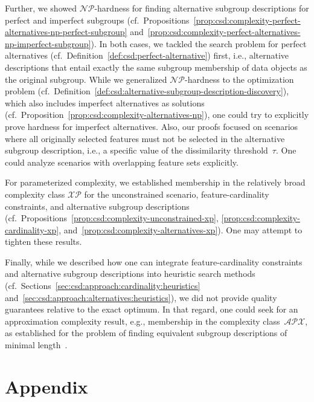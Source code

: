 \documentclass{article}
\theoremstyle{definition}
\begin{document}
Further, we showed $\mathcal{NP}$-hardness for finding alternative subgroup descriptions for perfect and imperfect subgroups (cf.~Propositions~\ref{prop:csd:complexity-perfect-alternatives-np-perfect-subgroup} and~\ref{prop:csd:complexity-perfect-alternatives-np-imperfect-subgroup}).
In both cases, we tackled the search problem for perfect alternatives (cf.~Definition~\ref{def:csd:perfect-alternative}) first, i.e., alternative descriptions that entail exactly the same subgroup membership of data objects as the original subgroup.
While we generalized $\mathcal{NP}$-hardness to the optimization problem (cf.~Definition~\ref{def:csd:alternative-subgroup-description-discovery}), which also includes imperfect alternatives as solutions (cf.~Proposition~\ref{prop:csd:complexity-alternatives-np}),
one could try to explicitly prove hardness for imperfect alternatives.
Also, our proofs focused on scenarios where all originally selected features must not be selected in the alternative subgroup description, i.e., a specific value of the dissimilarity threshold~$\tau$.
One could analyze scenarios with overlapping feature sets explicitly.

For parameterized complexity, we established membership in the relatively broad complexity class $\mathcal{XP}$ for the unconstrained scenario, feature-cardinality constraints, and alternative subgroup descriptions (cf.~Propositions~\ref{prop:csd:complexity-unconstrained-xp}, \ref{prop:csd:complexity-cardinality-xp}, and~\ref{prop:csd:complexity-alternatives-xp}).
One may attempt to tighten these results.

Finally, while we described how one can integrate feature-cardinality constraints and alternative subgroup descriptions into heuristic search methods (cf.~Sections~\ref{sec:csd:approach:cardinality:heuristics} and~\ref{sec:csd:approach:alternatives:heuristics}), we did not provide quality guarantees relative to the exact optimum.
In that regard, one could seek for an approximation complexity result, e.g., membership in the complexity class~$\mathcal{APX}$, as established for the problem of finding equivalent subgroup descriptions of minimal length~\cite{boley2009non}.


\appendix

\section{Appendix}
\label{sec:csd:appendix}
\end{document}
